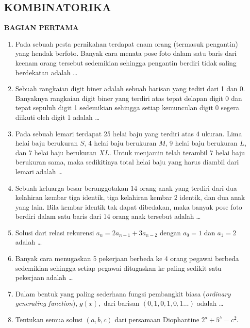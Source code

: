 \documentclass[12pt,twoside]{article}
\begin{document}
\subsection{KOMBINATORIKA}
\textbf{BAGIAN PERTAMA}
\begin{enumerate}
	\item Pada sebuah pesta pernikahan terdapat enam orang (termasuk pengantin) yang hendak berfoto. Banyak cara menata pose foto dalam satu baris dari keenam orang tersebut sedemikian sehingga pengantin berdiri tidak saling berdekatan adalah \dots

	\item Sebuah rangkaian digit biner adalah sebuah barisan yang tediri dari 1 dan 0. Banyaknya rangkaian digit biner yang terdiri atas tepat delapan digit 0 dan tepat sepuluh digit 1 sedemikian sehingga setiap kemunculan digit 0 segera diikuti oleh digit 1 adalah \dots

	\item Pada sebuah lemari terdapat 25 helai baju yang terdiri atas 4 ukuran. Lima helai baju berukuran $S$, 4 helai baju berukuran $M$, 9 helai baju berukuran $L$, dan 7 helai baju berukuran $XL$. Untuk menjamin telah terambil 7 helai baju berukuran sama, maka sedikitinya total helai baju yang harus diambil dari lemari adalah \dots

	\item Sebuah keluarga besar beranggotakan 14 orang anak yang terdiri dari dua kelahiran kembar tiga identik, tiga kelahiran kembar 2 identik, dan dua anak yang lain. Bila kembar identik tak dapat dibedakan, maka banyak pose foto berdiri dalam satu baris dari 14 orang anak tersebut adalah \dots

	\item Solusi dari relasi rekurensi $a_n = 2a_{n-1} + 3a_{n-2}$ dengan $a_0 = 1$ dan $a_1 = 2$ adalah \dots


	\item Banyak cara menugaskan 5 pekerjaan berbeda ke 4 orang pegawai berbeda sedemikian sehingga setiap pegawai ditugaskan ke paling sedikit satu pekerjaan adalah \dots

	\item Dalam bentuk yang paling sederhana fungsi pembangkit biasa (\textit{ordinary generating function}), $g(x),$ dari barisan $(0,1,0,1,0,1\dots)$ adalah \dots

	\item Tentukan semua solusi $(a,b,c)$ dari persamaan Diophantine $2^a + 5^b = c^2$.

\end{enumerate}
\end{document}
